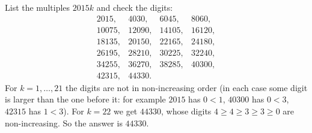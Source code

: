 List the multiples $2015k$ and check the digits:
\[
\begin{array}{llll}
2015, & 4030, & 6045, & 8060,\\
10075, & 12090, & 14105, & 16120,\\
18135, & 20150, & 22165, & 24180,\\
26195, & 28210, & 30225, & 32240,\\
34255, & 36270, & 38285, & 40300,\\
42315, & 44330 . &&
\end{array}
\]
For $k=1,\dots,21$ the digits are not in non-increasing order (in each case some digit is larger than the one before it: for example $2015$ has $0<1$, $40300$ has $0<3$, $42315$ has $1<3$). For $k=22$ we get $44330$, whose digits $4\ge4\ge3\ge3\ge0$ are non-increasing. So the answer is $\boxed{44330}$.
